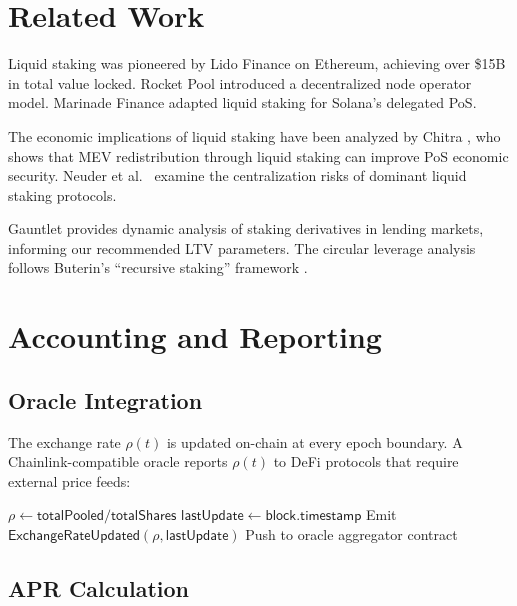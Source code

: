 \documentclass[11pt,a4paper]{article}
\begin{document}
\section{Related Work}\label{sec:related}

Liquid staking was pioneered by Lido Finance \cite{lidofinance} on Ethereum, achieving over \$15B in total value locked. Rocket Pool \cite{rocketpool} introduced a decentralized node operator model. Marinade Finance \cite{marinade} adapted liquid staking for Solana's delegated PoS.

The economic implications of liquid staking have been analyzed by Chitra \cite{chitra2022improving}, who shows that MEV redistribution through liquid staking can improve PoS economic security. Neuder et al.\ \cite{neuder2021} examine the centralization risks of dominant liquid staking protocols.

Gauntlet \cite{gauntlet2022} provides dynamic analysis of staking derivatives in lending markets, informing our recommended LTV parameters. The circular leverage analysis follows Buterin's ``recursive staking'' framework \cite{buterin2020recursive}.

\section{Accounting and Reporting}\label{sec:accounting}

\subsection{Oracle Integration}

The exchange rate $\rho(t)$ is updated on-chain at every epoch boundary. A Chainlink-compatible oracle reports $\rho(t)$ to DeFi protocols that require external price feeds:

\begin{algorithm}[H]
\caption{Exchange Rate Oracle Update}
\label{alg:oracle}
\begin{algorithmic}[1]
    \State $\rho \gets \mathsf{totalPooled} / \mathsf{totalShares}$
    \State $\mathsf{lastUpdate} \gets \mathsf{block.timestamp}$
    \State Emit $\mathsf{ExchangeRateUpdated}(\rho, \mathsf{lastUpdate})$
    \State Push to oracle aggregator contract
\EndProcedure
\end{algorithmic}
\end{algorithm}

\subsection{APR Calculation}
\end{document}
